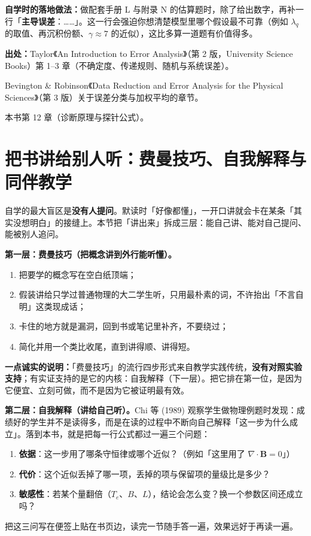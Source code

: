 \textbf{自学时的落地做法：}做配套手册 L 与附录 N 的估算题时，除了给出数字，再补一行「\textbf{主导误差}：……」。这一行会强迫你想清楚模型里哪个假设最不可靠（例如 $\lambda_q$ 的取值、再沉积份额、$\gamma\approx7$ 的近似），这比多算一道题有价值得多。

{\footnotesize
\textbf{出处：}Taylor《An Introduction to Error Analysis》（第 2 版，University Science Books）第 1--3 章（不确定度、传递规则、随机与系统误差）。

Bevington \& Robinson《Data Reduction and Error Analysis for the Physical Sciences》（第 3 版）关于误差分类与加权平均的章节。

本书第 12 章（诊断原理与探针公式）。
}


\section{把书讲给别人听：费曼技巧、自我解释与同伴教学}

自学的最大盲区是\textbf{没有人提问}。默读时「好像都懂」，一开口讲就会卡在某条「其实没想明白」的接缝上。本节把「讲出来」拆成三层：能自己讲、能对自己提问、能被别人追问。

\textbf{第一层：费曼技巧（把概念讲到外行能听懂）。}
\begin{enumerate}[nosep,leftmargin=1.6em]
  \item 把要学的概念写在空白纸顶端；
  \item 假装讲给只学过普通物理的大二学生听，只用最朴素的词，不许抬出「不言自明」这类现成话；
  \item 卡住的地方就是漏洞，回到书或笔记里补齐，不要绕过；
  \item 简化并用一个类比收尾，直到讲得顺、讲得短。
\end{enumerate}
\textbf{一点诚实的说明：}「费曼技巧」的流行四步形式来自教学实践传统，\textbf{没有对照实验支持}；有实证支持的是它的内核：自我解释（下一层）。把它排在第一位，是因为它便宜、立刻可做，而不是因为它被证明最有效。

\textbf{第二层：自我解释（讲给自己听）。}Chi 等 (1989) 观察学生做物理例题时发现：成绩好的学生并不是读得多，而是在读的过程中不断向自己解释「这一步为什么成立」。落到本书，就是把每一行公式都过一遍三个问题：
\begin{enumerate}[nosep,leftmargin=1.6em]
  \item \textbf{依据}：这一步用了哪条守恒律或哪个近似？（例如「这里用了 $\nabla\cdot\mathbf{B}=0$」）
  \item \textbf{代价}：这个近似丢掉了哪一项，丢掉的项与保留项的量级比是多少？
  \item \textbf{敏感性}：若某个量翻倍（$T_e$、$B$、$L$），结论会怎么变？换一个参数区间还成立吗？
\end{enumerate}
把这三问写在便签上贴在书页边，读完一节随手答一遍，效果远好于再读一遍。

